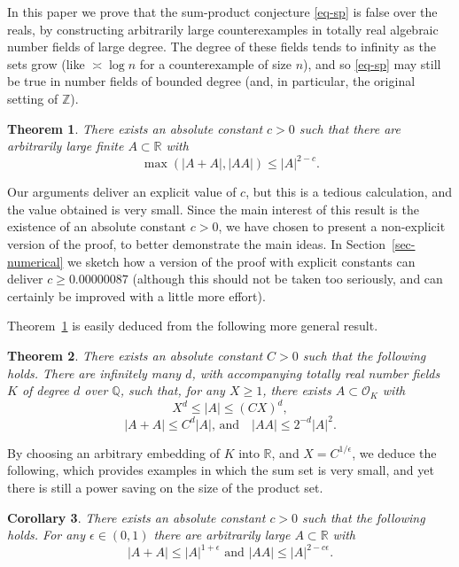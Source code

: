 \documentclass{amsart}
\numberwithin{equation}{section}
\newcommand{\bbq}{\mathbb{Q}}
\newcommand{\bbz}{\mathbb{Z}}
\newcommand{\abs}[1]{\mathopen{}\left| #1\mathclose{}\right|}
\newcommand{\bbr}{\mathbb{R}}
\newtheorem{theorem}{Theorem}[section]
\newtheorem{corollary}[theorem]{Corollary}
\begin{document}
In this paper we prove that the sum-product conjecture \eqref{eq-sp} is false over the reals, by constructing arbitrarily large counterexamples in totally real algebraic number fields of large degree. The degree of these fields tends to infinity as the sets grow (like $\asymp \log n$ for a counterexample of size $n$), and so \eqref{eq-sp} may still be true in number fields of bounded degree (and, in particular, the original setting of $\bbz$).

\begin{theorem}\label{th-headline}
There exists an absolute constant $c>0$ such that there are arbitrarily large finite $A\subset\bbr$ with
\[\max(\abs{A+A},\abs{AA})\leq \abs{A}^{2-c}.\]
\end{theorem}

Our arguments deliver an explicit value of $c$, but this is a tedious calculation, and the value obtained is very small. Since the main interest of this result is the existence of an absolute constant $c>0$, we have chosen to present a non-explicit version of the proof, to better demonstrate the main ideas. In Section~\ref{sec-numerical} we sketch how a version of the proof with explicit constants can deliver $c\geq 0.00000087$ (although this should not be taken too seriously, and can certainly be improved with a little more effort).

Theorem~\ref{th-headline} is easily deduced from the following more general result.
\begin{theorem}\label{th-main}
There exists an absolute constant $C>0$ such that the following holds. There are infinitely many $d$, with accompanying totally real number fields $K$ of degree $d$ over $\bbq$, such that, for any $X\geq 1$, there exists $A\subset \mathcal{O}_K$ with 
\[X^{d} \leq \abs{A}\leq (CX)^{d},\]
\[\abs{A+A}\leq C^{d}\abs{A}\textrm{, and}\quad\abs{AA}\leq 2^{-d}\abs{A}^2.\]
\end{theorem}
By choosing an arbitrary embedding of $K$ into $\bbr$, and $X=C^{1/\epsilon}$, we deduce the following, which provides examples in which the sum set is very small, and yet there is still a power saving on the size of the product set.
\begin{corollary}\label{cor-main}
There exists an absolute constant $c>0$ such that the following holds. For any $\epsilon\in (0,1)$ there are arbitrarily large $A\subset \bbr$ with
\[\abs{A+A}\leq \abs{A}^{1+\epsilon}\textrm{ and }\abs{AA}\leq \abs{A}^{2-c\epsilon}.\]
\end{corollary}
\end{document}
